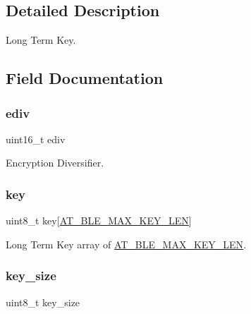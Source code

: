 \subsection{Detailed Description}
Long Term Key. 

\subsection{Field Documentation}
\mbox{\label{structat__ble___l_t_k__t_aced7ac80397d2549e5ecbb13de235936}} 
\subsubsection{\texorpdfstring{ediv}{ediv}}
{\footnotesize\ttfamily uint16\+\_\+t ediv}



Encryption Diversifier. 

\mbox{\label{structat__ble___l_t_k__t_abdd5757e31504574b5dc0ee379bced9f}} 
\subsubsection{\texorpdfstring{key}{key}}
{\footnotesize\ttfamily uint8\+\_\+t key\mbox{[}\mbox{\hyperlink{at__ble__api_8h_a462eb50567c44d7284308fe058158e99}{A\+T\+\_\+\+B\+L\+E\+\_\+\+M\+A\+X\+\_\+\+K\+E\+Y\+\_\+\+L\+EN}}\mbox{]}}



Long Term Key array of \mbox{\hyperlink{at__ble__api_8h_a462eb50567c44d7284308fe058158e99}{A\+T\+\_\+\+B\+L\+E\+\_\+\+M\+A\+X\+\_\+\+K\+E\+Y\+\_\+\+L\+EN}}. 

\mbox{\label{structat__ble___l_t_k__t_af3a98d356308b40e81d30c28ed11c6b0}} 
\subsubsection{\texorpdfstring{key\_size}{key\_size}}
{\footnotesize\ttfamily uint8\+\_\+t key\+\_\+size}



